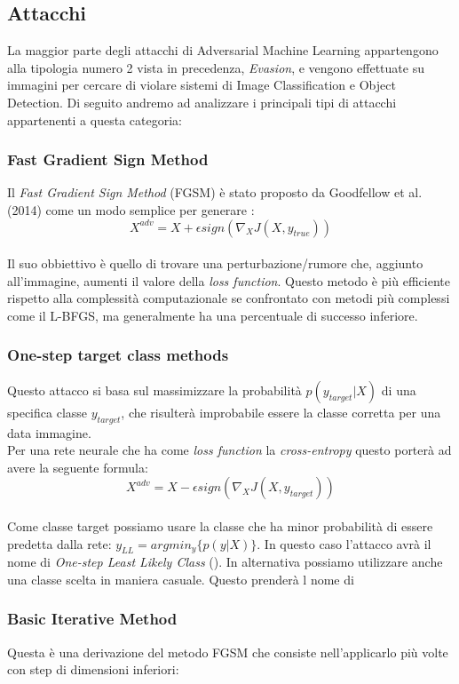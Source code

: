 \subsection{Attacchi}
La maggior parte degli attacchi di Adversarial Machine Learning appartengono alla tipologia numero 2 \cite{adversarial} vista in precedenza, \textit{Evasion}, e vengono effettuate su immagini per cercare di violare sistemi di Image Classification e Object Detection. 
Di seguito andremo ad analizzare i principali tipi di attacchi appartenenti a questa categoria:

\subsubsection{Fast Gradient Sign Method}
Il \textit{Fast Gradient Sign Method} (FGSM) è stato proposto da Goodfellow et al. (2014) come un modo semplice per generare :
\[X^{adv} = X + \epsilon sign(\nabla_XJ(X, y_{true}))\]
\\
Il suo obbiettivo è quello di trovare una perturbazione/rumore che, aggiunto all'immagine, aumenti il valore della \textit{loss function}.
Questo metodo è più efficiente rispetto alla complessità computazionale se confrontato con metodi più complessi come il L-BFGS, ma generalmente ha una percentuale di successo inferiore.

\subsubsection{One-step target class methods}
Questo attacco si basa sul massimizzare la probabilità \(p(y_{target} | X)\) di una specifica classe \(y_{target}\), che risulterà improbabile essere la classe corretta per una data immagine.\\
Per una rete neurale che ha come \textit{loss function} la \textit{cross-entropy} questo porterà ad avere la seguente formula:
\[X^{adv} = X - \epsilon sign(\nabla_XJ(X, y_{target}))\]
\\
Come classe target possiamo usare la classe che ha minor probabilità di essere predetta dalla rete: \(y_{LL} = arg min_y\{p(y | X)\}\). In questo caso l'attacco avrà il nome di \textit{One-step Least Likely Class} (). In alternativa possiamo utilizzare anche una classe scelta in maniera casuale. Questo prenderà l nome di 

\subsubsection{Basic Iterative Method}
Questa è una derivazione del metodo FGSM che consiste nell'applicarlo più volte con step di dimensioni inferiori:

